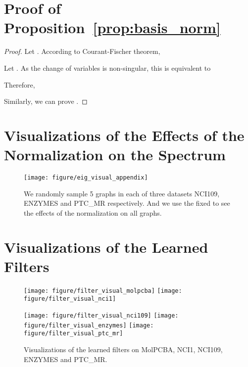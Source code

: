 \documentclass[nohyperref]{article}
\theoremstyle{plain}
\theoremstyle{definition}
\theoremstyle{remark}
\begin{document}
\section{Proof of Proposition~\ref{prop:basis_norm}}
\label{proof:prop:basis_norm}

\begin{proof}
	Let .
	According to Courant-Fischer theorem,
	
	Let . As the change of variables  is non-singular, this is equivalent to
	
	Therefore,
	
	Similarly, we can prove .
\end{proof}

\FloatBarrier
\section{Visualizations of the Effects of the Normalization  on the Spectrum}
\label{spectrum_visualizations}

\begin{figure}[h]
	\centering
	\texttt{[image: figure/eig\_visual\_appendix]}
	\vspace{-10pt}
	\caption{We randomly sample 5 graphs in each of three datasets NCI109, ENZYMES and PTC\_MR respectively. And we use the fixed  to see the effects of the normalization on all graphs.}
	\label{fig:spectrum_visualizations}
\end{figure}

\FloatBarrier
\section{Visualizations of the Learned Filters}
\label{filter_visualizations}

\begin{figure}[h]
	\centering
	\texttt{[image: figure/filter\_visual\_molpcba]}
	\texttt{[image: figure/filter\_visual\_nci1]}
\end{figure}
\begin{figure}[h]
	\texttt{[image: figure/filter\_visual\_nci109]}
	\texttt{[image: figure/filter\_visual\_enzymes]}
	\texttt{[image: figure/filter\_visual\_ptc\_mr]}
	\caption{Visualizations of the learned filters on MolPCBA, NCI1, NCI109, ENZYMES and PTC\_MR.}
	\label{fig:filter_visualizations1}
\end{figure}

\FloatBarrier
\end{document}
